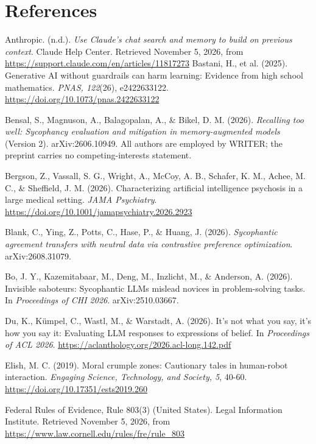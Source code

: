 \newpage
\section*{References}
\vspace{6pt}
\begingroup
\setlength{\parindent}{-14pt}\setlength{\leftskip}{14pt}\setlength{\parskip}{5pt}
Anthropic. (n.d.). \emph{Use Claude's chat search and memory to build on previous context}. Claude Help Center. Retrieved November 5, 2026, from \url{https://support.claude.com/en/articles/11817273}
Bastani, H., et al. (2025). Generative AI without guardrails can harm learning: Evidence from high school mathematics. \emph{PNAS, 122}(26), e2422633122. \url{https://doi.org/10.1073/pnas.2422633122}

Bensal, S., Magnuson, A., Balagopalan, A., \& Bikel, D. M. (2026). \emph{Recalling too well: Sycophancy evaluation and mitigation in memory-augmented models} (Version 2). arXiv:2606.10949. All authors are employed by WRITER; the preprint carries no competing-interests statement.

Bergson, Z., Vassall, S. G., Wright, A., McCoy, A. B., Schafer, K. M., Achee, M. C., \& Sheffield, J. M. (2026). Characterizing artificial intelligence psychosis in a large medical setting. \emph{JAMA Psychiatry}. \url{https://doi.org/10.1001/jamapsychiatry.2026.2923}

Blank, C., Ying, Z., Potts, C., Hase, P., \& Huang, J. (2026). \emph{Sycophantic agreement transfers with neutral data via contrastive preference optimization}. arXiv:2608.31079.

Bo, J. Y., Kazemitabaar, M., Deng, M., Inzlicht, M., \& Anderson, A. (2026). Invisible saboteurs: Sycophantic LLMs mislead novices in problem-solving tasks. In \emph{Proceedings of CHI 2026}. arXiv:2510.03667.

Du, K., K\"umpel, C., Wastl, M., \& Warstadt, A. (2026). It's not what you say, it's how you say it: Evaluating LLM responses to expressions of belief. In \emph{Proceedings of ACL 2026}. \url{https://aclanthology.org/2026.acl-long.142.pdf}

Elish, M. C. (2019). Moral crumple zones: Cautionary tales in human-robot interaction. \emph{Engaging Science, Technology, and Society, 5}, 40-60. \url{https://doi.org/10.17351/ests2019.260}

Federal Rules of Evidence, Rule 803(3) (United States). Legal Information Institute. Retrieved November 5, 2026, from \url{https://www.law.cornell.edu/rules/fre/rule_803}

